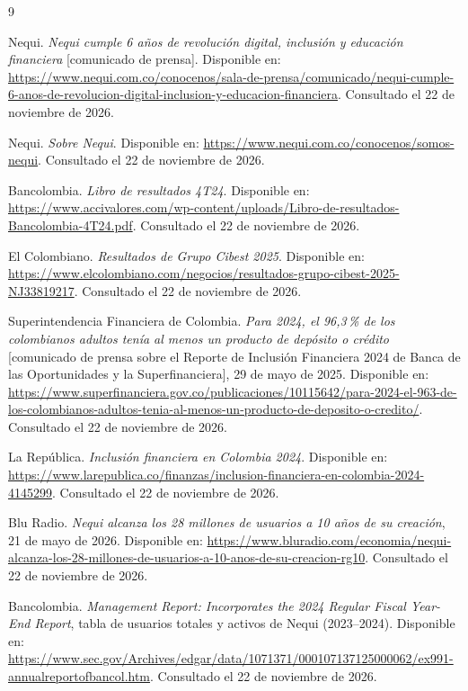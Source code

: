 \documentclass[12pt,a4paper]{article}
\begin{document}
\begin{thebibliography}{9}

Nequi. \emph{Nequi cumple 6 a\~nos de revoluci\'on digital, inclusi\'on y educaci\'on financiera} [comunicado de prensa]. Disponible en: \url{https://www.nequi.com.co/conocenos/sala-de-prensa/comunicado/nequi-cumple-6-anos-de-revolucion-digital-inclusion-y-educacion-financiera}. Consultado el 22 de noviembre de 2026.

Nequi. \emph{Sobre Nequi}. Disponible en: \url{https://www.nequi.com.co/conocenos/somos-nequi}. Consultado el 22 de noviembre de 2026.

Bancolombia. \emph{Libro de resultados 4T24}. Disponible en: \url{https://www.accivalores.com/wp-content/uploads/Libro-de-resultados-Bancolombia-4T24.pdf}. Consultado el 22 de noviembre de 2026.

El Colombiano. \emph{Resultados de Grupo Cibest 2025}. Disponible en: \url{https://www.elcolombiano.com/negocios/resultados-grupo-cibest-2025-NJ33819217}. Consultado el 22 de noviembre de 2026.

Superintendencia Financiera de Colombia. \emph{Para 2024, el 96,3\,\% de los colombianos adultos ten\'ia al menos un producto de dep\'osito o cr\'edito} [comunicado de prensa sobre el Reporte de Inclusi\'on Financiera 2024 de Banca de las Oportunidades y la Superfinanciera], 29 de mayo de 2025. Disponible en: \url{https://www.superfinanciera.gov.co/publicaciones/10115642/para-2024-el-963-de-los-colombianos-adultos-tenia-al-menos-un-producto-de-deposito-o-credito/}. Consultado el 22 de noviembre de 2026.

La Rep\'ublica. \emph{Inclusi\'on financiera en Colombia 2024}. Disponible en: \url{https://www.larepublica.co/finanzas/inclusion-financiera-en-colombia-2024-4145299}. Consultado el 22 de noviembre de 2026.

Blu Radio. \emph{Nequi alcanza los 28 millones de usuarios a 10 a\~nos de su creaci\'on}, 21 de mayo de 2026. Disponible en: \url{https://www.bluradio.com/economia/nequi-alcanza-los-28-millones-de-usuarios-a-10-anos-de-su-creacion-rg10}. Consultado el 22 de noviembre de 2026.


Bancolombia. \emph{Management Report: Incorporates the 2024 Regular Fiscal Year-End Report}, tabla de usuarios totales y activos de Nequi (2023--2024). Disponible en: \url{https://www.sec.gov/Archives/edgar/data/1071371/000107137125000062/ex991-annualreportofbancol.htm}. Consultado el 22 de noviembre de 2026.


\end{thebibliography}
\end{document}
